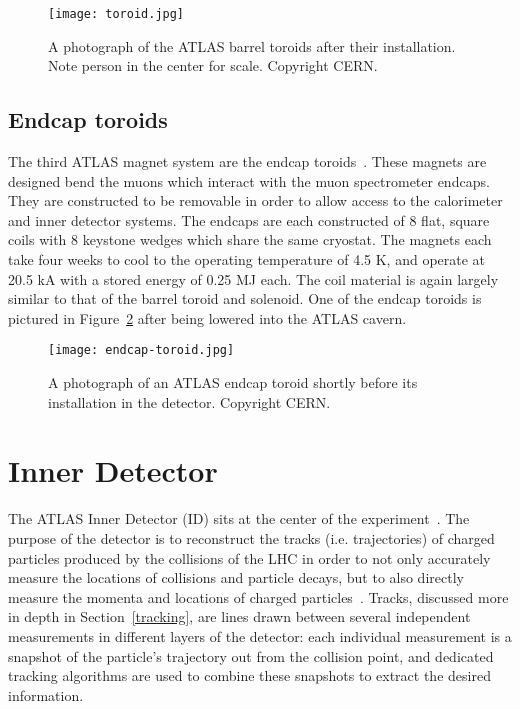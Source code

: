 
\begin{figure}
\centering
\texttt{[image: toroid.jpg]}
\label{fig:detector:toroid}
\caption{A photograph of the ATLAS barrel toroids after their installation. Note person in the center for scale. Copyright CERN.}
\end{figure}


\subsection{Endcap toroids}

The third ATLAS magnet system are the endcap toroids~\cite{ATLASPaper,ATLASMS}. These magnets are designed bend the muons which interact with the muon spectrometer endcaps. They are constructed to be removable in order to allow access to the calorimeter and inner detector systems. The endcaps are each constructed of 8 flat, square coils with 8 keystone wedges which share the same cryostat. The magnets each take four weeks to cool to the operating temperature of 4.5 K, and operate at 20.5 kA with a stored energy of 0.25 MJ each. The coil material is again largely similar to that of the barrel toroid and solenoid. One of the endcap toroids is pictured in Figure~\ref{fig:detector:endcap-toroid} after being lowered into the ATLAS cavern.



\begin{figure}
\centering
\texttt{[image: endcap-toroid.jpg]}
\label{fig:detector:endcap-toroid}
\caption{A photograph of an ATLAS endcap toroid shortly before its installation in the detector. Copyright CERN.}
\end{figure}



\section{Inner Detector}

The ATLAS Inner Detector (ID) sits at the center of the experiment~\cite{ATLASPaper}. The purpose of the detector is to reconstruct the tracks (i.e. trajectories) of charged particles produced by the collisions of the LHC in order to not only accurately measure the locations of collisions and particle decays, but to also directly measure the momenta and locations of charged particles~\cite{ATLASExpected}. Tracks, discussed more in depth in Section~\ref{tracking}, are lines drawn between several independent measurements in different layers of the detector: each individual measurement is a snapshot of the particle's trajectory out from the collision point, and dedicated tracking algorithms are used to combine these snapshots to extract the desired information.

